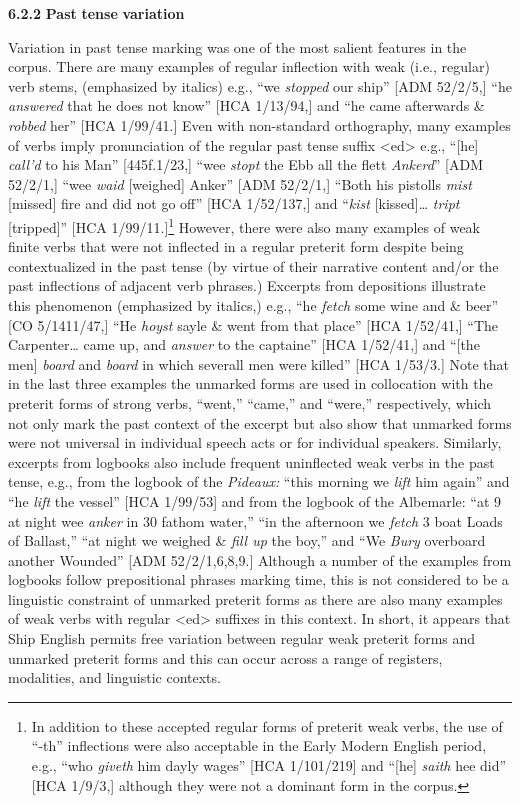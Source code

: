   \textbf{6.2.2} \textbf{Past} \textbf{tense} \textbf{variation} 

  Variation in past tense marking was one of the most salient features in the corpus. There are many examples of regular inflection with weak (i.e., regular) verb stems, (emphasized by italics) e.g., “we \textit{stopped} our ship” [ADM 52/2/5,] “he \textit{answered} that he does not know” [HCA 1/13/94,] and “he came afterwards \&  \textit{robbed} her” [HCA 1/99/41.] Even with non-standard orthography, many examples of verbs imply pronunciation of the regular past tense suffix <ed> e.g., “[he] \textit{call’d} to his Man” [445f.1/23,] “wee \textit{stopt} the Ebb all the flett \textit{Ankerd}” [ADM 52/2/1,] “wee \textit{waid} [weighed] Anker” [ADM 52/2/1,] “Both his pistolls \textit{mist} [missed] fire and did not go off” [HCA 1/52/137,] and “\textit{kist} [kissed]… \textit{tript} [tripped]” [HCA 1/99/11.]\footnote{In addition to these accepted regular forms of preterit weak verbs, the use of “-th” inflections were also acceptable in the Early Modern English period, e.g., “who \textit{giveth} him dayly wages” [HCA 1/101/219] and “[he] \textit{saith} hee did” [HCA 1/9/3,] although they were not a dominant form in the corpus.} However, there were also many examples of weak finite verbs that were not inflected in a regular preterit form despite being contextualized in the past tense (by virtue of their narrative content and/or the past inflections of adjacent verb phrases.) Excerpts from depositions illustrate this phenomenon (emphasized by italics,) e.g., “he \textit{fetch} some wine and \& beer” [CO 5/1411/47,] “He \textit{hoyst} sayle \& went from that place” [HCA 1/52/41,] “The Carpenter… came up, and \textit{answer} to the captaine” [HCA 1/52/41,] and “[the men] \textit{board} and \textit{board} in which severall men were killed” [HCA 1/53/3.] Note that in the last three examples the unmarked forms are used in collocation with the preterit forms of strong verbs, “went,” “came,” and “were,” respectively, which not only mark the past context of the excerpt but also show that unmarked forms were not universal in individual speech acts or for individual speakers. Similarly, excerpts from logbooks also include frequent uninflected weak verbs in the past tense, e.g., from the logbook of the \textit{Pideaux:} “this morning we \textit{lift} him again” and “he \textit{lift} the vessel” [HCA 1/99/53] and from the logbook of the Albemarle: “at 9 at night wee \textit{anker} in 30 fathom water,” “in the afternoon we \textit{fetch} 3 boat Loads of Ballast,” “at night we weighed \& \textit{fill up} the boy,” and “We \textit{Bury} overboard another Wounded” [ADM 52/2/1,6,8,9.] Although a number of the examples from logbooks follow prepositional phrases marking time, this is not considered to be a linguistic constraint of unmarked preterit forms as there are also many examples of weak verbs with regular <ed> suffixes in this context. In short, it appears that Ship English permits free variation between regular weak preterit forms and unmarked preterit forms and this can occur across a range of registers, modalities, and linguistic contexts. 


